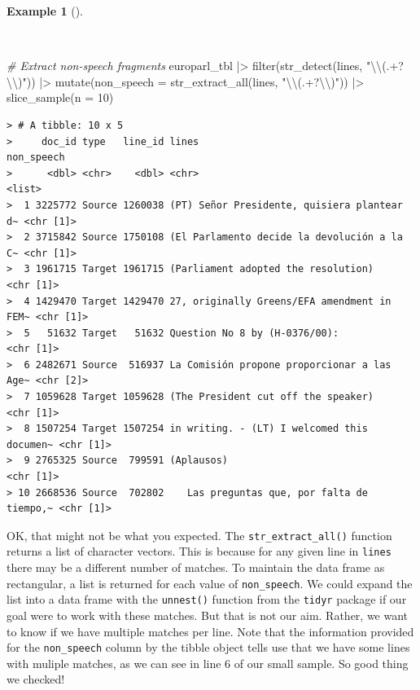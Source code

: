\documentclass[
  letterpaper,
  DIV=11,
  numbers=noendperiod]{scrreprt}
\newenvironment{Shaded}{\begin{snugshade}}{\end{snugshade}}
\newcommand{\AttributeTok}[1]{\textcolor[rgb]{0.00,0.00,0.00}{#1}}
\newcommand{\CommentTok}[1]{\textcolor[rgb]{0.00,0.00,0.00}{\textit{#1}}}
\newcommand{\DecValTok}[1]{\textcolor[rgb]{0.00,0.00,0.00}{#1}}
\newcommand{\FunctionTok}[1]{\textcolor[rgb]{0.00,0.00,0.00}{#1}}
\newcommand{\NormalTok}[1]{\textcolor[rgb]{0.00,0.00,0.00}{#1}}
\newcommand{\SpecialCharTok}[1]{\textcolor[rgb]{0.00,0.00,0.00}{#1}}
\newcommand{\StringTok}[1]{\textcolor[rgb]{0.00,0.00,0.00}{#1}}
\theoremstyle{definition}
\newtheorem{example}{Example}[chapter]
\theoremstyle{remark}
\begin{document}
\begin{example}[]\protect\hypertarget{exm-td-europarl-search-non-speech-2}{}\label{exm-td-europarl-search-non-speech-2}

~

\begin{Shaded}
\begin{Highlighting}[]
\CommentTok{\# Extract non{-}speech fragments}
\NormalTok{europarl\_tbl }\SpecialCharTok{|\textgreater{}}
  \FunctionTok{filter}\NormalTok{(}\FunctionTok{str\_detect}\NormalTok{(lines, }\StringTok{"}\SpecialCharTok{\textbackslash{}\textbackslash{}}\StringTok{(.+?}\SpecialCharTok{\textbackslash{}\textbackslash{}}\StringTok{)"}\NormalTok{)) }\SpecialCharTok{|\textgreater{}}
  \FunctionTok{mutate}\NormalTok{(}\AttributeTok{non\_speech =} \FunctionTok{str\_extract\_all}\NormalTok{(lines, }\StringTok{"}\SpecialCharTok{\textbackslash{}\textbackslash{}}\StringTok{(.+?}\SpecialCharTok{\textbackslash{}\textbackslash{}}\StringTok{)"}\NormalTok{)) }\SpecialCharTok{|\textgreater{}}
  \FunctionTok{slice\_sample}\NormalTok{(}\AttributeTok{n =} \DecValTok{10}\NormalTok{)}
\end{Highlighting}
\end{Shaded}

\begin{verbatim}
> # A tibble: 10 x 5
>     doc_id type   line_id lines                                       non_speech
>      <dbl> <chr>    <dbl> <chr>                                       <list>    
>  1 3225772 Source 1260038 (PT) Señor Presidente, quisiera plantear d~ <chr [1]> 
>  2 3715842 Source 1750108 (El Parlamento decide la devolución a la C~ <chr [1]> 
>  3 1961715 Target 1961715 (Parliament adopted the resolution)         <chr [1]> 
>  4 1429470 Target 1429470 27, originally Greens/EFA amendment in FEM~ <chr [1]> 
>  5   51632 Target   51632 Question No 8 by (H-0376/00):               <chr [1]> 
>  6 2482671 Source  516937 La Comisión propone proporcionar a las Age~ <chr [2]> 
>  7 1059628 Target 1059628 (The President cut off the speaker)         <chr [1]> 
>  8 1507254 Target 1507254 in writing. - (LT) I welcomed this documen~ <chr [1]> 
>  9 2765325 Source  799591 (Aplausos)                                  <chr [1]> 
> 10 2668536 Source  702802    Las preguntas que, por falta de tiempo,~ <chr [1]>
\end{verbatim}

\end{example}

OK, that might not be what you expected. The
\texttt{str\_extract\_all()} function returns a list of character
vectors. This is because for any given line in \texttt{lines} there may
be a different number of matches. To maintain the data frame as
rectangular, a list is returned for each value of \texttt{non\_speech}.
We could expand the list into a data frame with the \texttt{unnest()}
function from the \texttt{tidyr} package if our goal were to work with
these matches. But that is not our aim. Rather, we want to know if we
have multiple matches per line. Note that the information provided for
the \texttt{non\_speech} column by the tibble object tells use that we
have some lines with muliple matches, as we can see in line 6 of our
small sample. So good thing we checked!
\end{document}
